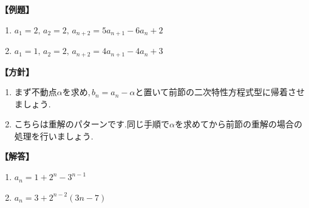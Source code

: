 \documentclass[dvipdfmx,a4paper,11pt,fleqn,openany]{jsbook}
\begin{document}
      \noindent \textbf{【例題】}
      \begin{enumerate}[label=(\arabic*),parsep=3pt]
        \item $\displaystyle a_1=2,\,a_2=2,\, a_{n+2}=5a_{n+1}-6a_n+2$
        \item $\displaystyle a_1=1,\,a_2=2,\, a_{n+2}=4a_{n+1}-4a_n+3$
      \end{enumerate}

      \noindent\textbf{【方針】}
      \begin{enumerate}[label=(\arabic*),parsep=3pt]
        \item まず不動点$\alpha$を求め,\,$b_n=a_n-\alpha$と置いて前節の二次特性方程式型に帰着させましょう.
        \item こちらは重解のパターンです.同じ手順で$\alpha$を求めてから前節の重解の場合の処理を行いましょう.
      \end{enumerate}

      \noindent\textbf{【解答】}
      \begin{enumerate}[label=(\arabic*),parsep=3pt]
        \item $\displaystyle a_n=1+2^n-3^{n-1}$
        \item $\displaystyle a_n=3+2^{n-2}(3n-7)$
      \end{enumerate}
\end{document}
